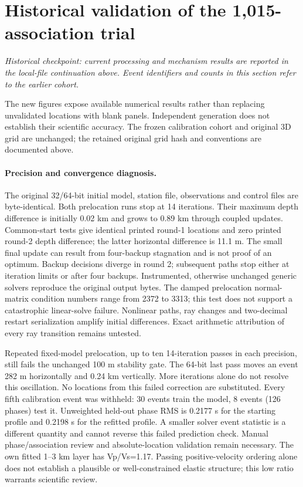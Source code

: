 \section{Historical validation of the 1,015-association trial}
\noindent\textit{Historical checkpoint: current processing and mechanism results are reported in the local-file continuation above. Event identifiers and counts in this section refer to the earlier cohort.}\par
The new figures expose available numerical results rather than replacing unvalidated locations with blank panels. Independent generation does not establish their scientific accuracy. The frozen calibration cohort and original 3D grid are unchanged; the retained original grid hash and conventions are documented above.

\paragraph{Precision and convergence diagnosis.}
The original 32/64-bit initial model, station file, observations and control files are byte-identical. Both prelocation runs stop at 14 iterations. Their maximum depth difference is initially 0.02 km and grows to 0.89 km through coupled updates. Common-start tests give identical printed round-1 locations and zero printed round-2 depth difference; the latter horizontal difference is 11.1 m. The small final update can result from four-backup stagnation and is not proof of an optimum. Backup decisions diverge in round 2; subsequent paths stop either at iteration limits or after four backups. Instrumented, otherwise unchanged generic solvers reproduce the original output bytes. The damped prelocation normal-matrix condition numbers range from 2372 to 3313; this test does not support a catastrophic linear-solve failure. Nonlinear paths, ray changes and two-decimal restart serialization amplify initial differences. Exact arithmetic attribution of every ray transition remains untested.

Repeated fixed-model prelocation, up to ten 14-iteration passes in each precision, still fails the unchanged 100 m stability gate. The 64-bit last pass moves an event 282 m horizontally and 0.24 km vertically. More iterations alone do not resolve this oscillation. No locations from this failed correction are substituted. Every fifth calibration event was withheld: 30 events train the model, 8 events (126 phases) test it. Unweighted held-out phase RMS is 0.2177 s for the starting profile and 0.2198 s for the refitted profile. A smaller solver event statistic is a different quantity and cannot reverse this failed prediction check. Manual phase/association review and absolute-location validation remain necessary. The own fitted 1--3 km layer has Vp/Vs=1.17. Passing positive-velocity ordering alone does not establish a plausible or well-constrained elastic structure; this low ratio warrants scientific review.

